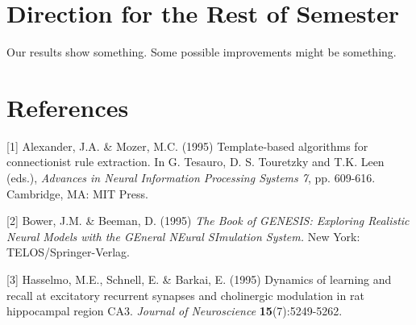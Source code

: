 \documentclass{article} %
\begin{document}
\section{Direction for the Rest of Semester}

Our results show something. Some possible improvements might be something.

\section*{References}

\small{
[1] Alexander, J.A. \& Mozer, M.C. (1995) Template-based algorithms
for connectionist rule extraction. In G. Tesauro, D. S. Touretzky
and T.K. Leen (eds.), {\it Advances in Neural Information Processing
Systems 7}, pp. 609-616. Cambridge, MA: MIT Press.

[2] Bower, J.M. \& Beeman, D. (1995) {\it The Book of GENESIS: Exploring
Realistic Neural Models with the GEneral NEural SImulation System.}
New York: TELOS/Springer-Verlag.

[3] Hasselmo, M.E., Schnell, E. \& Barkai, E. (1995) Dynamics of learning
and recall at excitatory recurrent synapses and cholinergic modulation
in rat hippocampal region CA3. {\it Journal of Neuroscience}
{\bf 15}(7):5249-5262.
}
\end{document}

